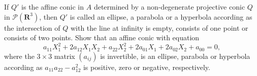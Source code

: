 If $Q'$ is the affine conic in $A$ determined by a non-degenerate projective conic $Q$ in $\mathcal{P}(\mathbf{R}^3)$, then $Q'$ is called an ellipse, a parabola or a hyperbola according as the intersection of $Q$ with the line at infinity is empty, consists of one point or consists of two points. Show that an affine conic with equation
$$a_{11}X_1^2 + 2a_{12}X_1X_2 + a_{22}X_2^2 + 2a_{01}X_1 + 2a_{02}X_2 + a_{00} = 0,$$
where the $3 \times 3$ matrix $(a_{ij})$ is invertible, is an ellipse, parabola or hyperbola according as $a_{11}a_{22} - a_{12}^2$ is positive, zero or negative, respectively.
